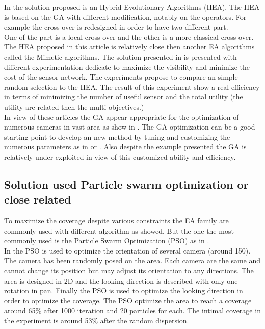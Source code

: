 In  \cite{101*topcuoglu2009} the solution proposed is an Hybrid Evolutionary Algorithms (HEA).  The HEA is based on the GA with different modification, notably on the operators. For example the cross-over is redesigned in order to have two different part. \\
One of the part is a local cross-over and the other is a more classical cross-over.  The HEA proposed in this article is relatively close then another EA algorithms called the Mimetic algorithms. 
The solution presented in \cite{101*topcuoglu2009} is   presented with different experimentation dedicate  to maximize the visibility and minimize the cost of the sensor network. The experiments propose to compare an simple random selection to the HEA. The result of this experiment show a real efficiency in terms of minimizing the number of useful sensor and the total utility (the utility are related then the multi objectives.) \\

In view of these articles the GA appear appropriate for the optimization of numerous cameras in vast area as show in \cite{165*jiang2010}. The GA optimization can be a good starting point to develop an new method by tuning and customizing the numerous parameters as in \cite{101*topcuoglu2009,152*wang2009}  or \cite{83*van2009}. Also despite the example presented  the GA is relatively under-exploited in view of this customized ability and efficiency.


\subsection{Solution used Particle swarm optimization or close related}	

To maximize the coverage despite various constraints the EA family are commonly used with different algorithm as showed.  But the one the most commonly used is the Particle Swarm Optimization (PSO) as in \cite{84*xu2011,8*zhou2011,33*reddy2012,143*maji2015,193*fu2014,194*fu2010,200*kulkarni2011}.   \\

 In \cite{84*xu2011} the PSO is used to optimize the orientation of several camera (around 150).
The camera has been randomly posed on the area. Each camera are the same and cannot change its position but may adjust its orientation to any directions. The area is designed in 2D and the looking direction is described with only one rotation in pan.  
Finally the PSO is used to optimize the looking direction in order to optimize the coverage. The PSO optimize the area to reach a coverage around 65\% after 1000 iteration and 20 particles for each. The intimal coverage in the experiment is around 53\% after the random dispersion. \\


